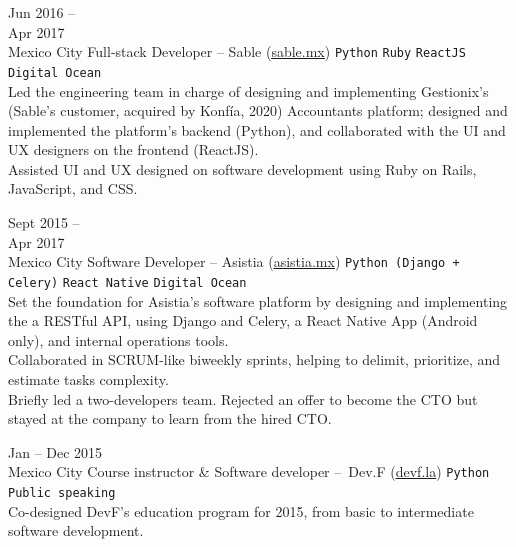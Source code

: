 \documentclass[9pt]{developercv} %
\begin{document}
\begin{entrylist}
    \entry
        {
            Jun 2016 -- \\Apr 2017
            \\\footnotesize{Mexico City}
        }
        {Full-stack Developer – Sable ({\href{https://sable.mx/}{\underline{sable.mx}}})}
        {
            \texttt{Python}
            \slashsep\texttt{Ruby}
            \slashsep\texttt{ReactJS}
            \slashsep\texttt{Digital Ocean}
        }
        {\\
            Led the engineering team in charge of designing and implementing Gestionix's 
            (Sable's customer, acquired by Konfía, 2020) Accountants platform; designed and implemented
            the platform's backend (Python), and collaborated with the UI and UX designers on the 
            frontend (ReactJS).\\

            Assisted UI and UX designed on software development using Ruby on Rails, JavaScript, and CSS.\\            
        }

    \entry
        {
            Sept 2015 --\\Apr 2017
            \\\footnotesize{Mexico City}
        }
        {Software Developer – Asistia ({\href{https://www.linkedin.com/company/asistia/}{\underline{asistia.mx}}})}
        {
            \texttt{Python (Django + Celery)}
            \slashsep\texttt{React Native}
            \slashsep\texttt{Digital Ocean}
        }
        {\\
            Set the foundation for Asistia's software platform by designing and implementing the a 
            RESTful API, using Django and Celery, a React Native App (Android only), and internal 
            operations tools.\\

            Collaborated in SCRUM-like biweekly sprints, helping to delimit, prioritize, and estimate 
            tasks complexity.\\
            
            Briefly led a two-developers team. Rejected an offer to become the CTO but stayed at the company to learn from the hired CTO.
        }

    \entry
        {
            Jan -- Dec 2015
            \\\footnotesize{Mexico City}
        }
        {Course instructor \& Software developer – Dev.F ({\href{https://devf.la/}{\underline{devf.la}}})}
        {
            \texttt{Python}
            \slashsep\texttt{Public speaking}
        }
        {\\
            Co-designed DevF's education program for 2015, from basic to intermediate software development. \\

}
\end{entrylist}
\end{document}
